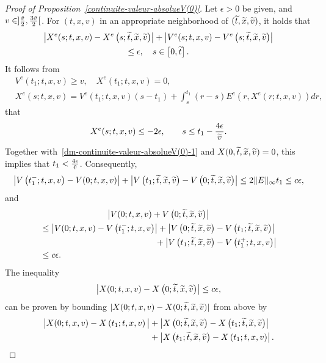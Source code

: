 \documentclass[10pt]{amsart}
\theoremstyle{definition}\newtheorem{defi}[theo]{Definition}\newtheorem{rema}[theo]{Remark}\newtheorem{exam}[theo]{Example}\newtheorem{exem}[theo]{Example}\newtheorem{nota}[theo]{Notation}
\let\oldtilde\tilde
\renewcommand*{\tilde}[1]{\mathchoice{\widetilde{#1}}{\widetilde{#1}}{\oldtilde{#1}}{\oldtilde{#1}}}
\begin{document}
\begin{proof}[{Proof of Proposition~\ref{continuite-valeur-absolueV(0)}}]
Let $\epsilon >0$ be given, and $v\in]
\frac{\tilde{v}}{2},\frac{3\tilde{v}}{2}[$. For $(t,x,v)$ in an appropriate neighborhood of $(\tilde{t},\tilde{x},\tilde{v})$, it holds that
\begin{multline}\label{dm-continuite-valeur-absolueV(0)-1}
\left|X^e(s;t,x,v)-X^e\left(s;\tilde{t},\tilde{x},\tilde{v}\right)\right|+\left|V^e(s;t,x,v)-V^e\left(s;\tilde{t},\tilde{x},\tilde{v}\right)\right|\\
\leq \epsilon, \quad s \in \left[0,\tilde{t}\right].
\end{multline}
It follows from
\begin{align*}
&V^e(t_1;t,x,v)\geq v,\quad X^e(t_1;t,x,v)= 0,\\
&X^e(s;t,x,v)= V^e(t_1;t,x,v)(s-t_1)+\int _s^{t_1}(r-s) E^e\left(r,X^e(r;t,x,v)\right)dr,
\end{align*}
that
\[
X^e(s;t,x,v)\leq -2\epsilon, \qquad s \leq t_1 - \frac{4\epsilon }{\tilde{v}}.
\]
Together with~\eqref{dm-continuite-valeur-absolueV(0)-1} and $X(0,\tilde{t},\tilde{x},\tilde{v})= 0$, this implies that $t_1<\frac{4\epsilon }{\tilde{v}}$. Consequently,
\[
\left|V\left(t_1^-;t,x,v\right)-V(0;t,x,v)\right| + \left|V\left(t_1;\tilde{t},\tilde{x},\tilde{v}\right)-V\left(0;\tilde{t},\tilde{x},\tilde{v}\right)\right| \leq 2 \|E\|_{\infty} t_1 \leq c\epsilon,
\]
and
\begin{multline*}
\left| V(0;t,x,v)+V\left(0;\tilde{t},\tilde{x},\tilde{v}\right)\right| \\
\begin{aligned}
&\leq \left| V(0;t,x,v)-V\left(t_1^-;t,x,v\right) \right| + \left| V\left(0;\tilde{t},\tilde{x},\tilde{v}\right)-V\left(t_1;\tilde{t},\tilde{x},\tilde{v}\right)\right|\\
&\mkern243mu+ \left|V\left(t_1;\tilde{t},\tilde{x},\tilde{v}\right)-V\left(t_1^+;t,x,v\right)\right| \\
&\leq c\epsilon.
\end{aligned}
\end{multline*}
The inequality
\[
\left|X(0;t,x,v)-X\left(0;\tilde{t},\tilde{x},\tilde{v}\right)\right| \leq c\epsilon,
\]
can be proven by bounding $|X(0;t,x,v)-X(0;\tilde{t},\tilde{x},\tilde{v})|$ from above by
\begin{align*}
\big|X(0;t,x,v)-X\left(t_1;t,x,v\right)\big| &+ \left|X\left(0;\tilde{t},\tilde{x},\tilde{v}\right)-X\left(t_1;\tilde{t},\tilde{x},\tilde{v}\right)\right|\\
 &+ \left|X\left(t_1;\tilde{t},\tilde{x},\tilde{v}\right)-X\left(t_1;t,x,v\right)\right|.
\end{align*}

\end{proof}
\end{document}
